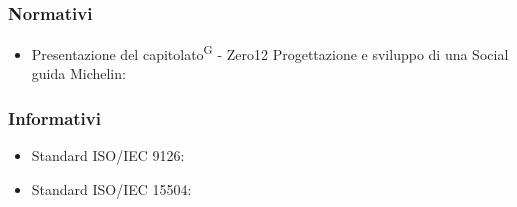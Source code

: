 \subsubsection{Normativi}
\begin{itemize}
\item Presentazione del capitolato\textsuperscript{G} - Zero12 Progettazione e sviluppo di una Social guida Michelin: \newline{}
\end{itemize}

\subsubsection{Informativi}
\begin{itemize}
\item Standard ISO/IEC 9126: \newline{}
\item Standard ISO/IEC 15504: \newline{}

\end{itemize}
